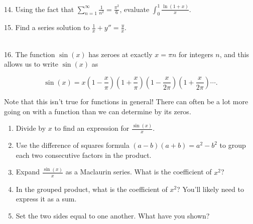 \documentclass{article}
\begin{document}
14. Using the fact that $\displaystyle \sum_{n = 1}^\infty \frac{1}{n^2} = \frac{\pi^2}{6}$, evaluate $\displaystyle \int_0^1 \frac{\ln(1 + x)}{x}$.

15. Find a series solution to $\displaystyle \frac{1}{x} + y'' = \frac{y}{x}$.

~\\

16. The function $\sin(x)$ has zeroes at exactly $x = \pi n$ for integers $n$, and this allows us to write $\sin(x)$ as

$$
	\sin(x) = x\left( 1 - \frac{x}{\pi} \right)\left( 1 + \frac{x}{\pi} \right)\left( 1 - \frac{x}{2\pi} \right)\left( 1 + \frac{x}{2\pi} \right) \cdots.
$$

Note that this isn't true for functions in general! There can often be a lot more going on with a function than we can determine by its zeros.

\begin{enumerate}

	\item Divide by $x$ to find an expression for $\displaystyle \frac{\sin(x)}{x}$.

	\item Use the difference of squares formula $(a - b)(a + b) = a^2 - b^2$ to group each two consecutive factors in the product.

	\item Expand $\displaystyle \frac{\sin(x)}{x}$ as a Maclaurin series. What is the coefficient of $x^2$?

	\item In the grouped product, what is the coefficient of $x^2$? You'll likely need to express it as a sum.

	\item Set the two sides equal to one another. What have you shown?

\end{enumerate}
\end{document}

